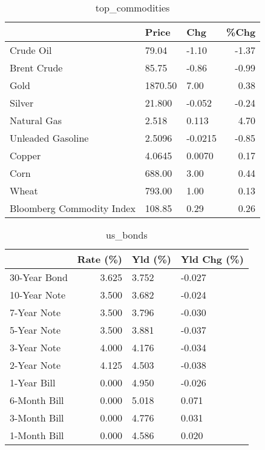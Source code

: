 \documentclass{article}%
\begin{document}
\begin{table}[htbp]%
\caption{top\_commodities}%
\centering%
\begin{adjustbox}{width=1\textwidth}%
\begin{tabular}{lllr}
\toprule
                          &   Price &     Chg &  \%Chg \\
\midrule
               Crude Oil  &   79.04 &   -1.10 & -1.37 \\
             Brent Crude  &   85.75 &   -0.86 & -0.99 \\
                    Gold  & 1870.50 &    7.00 &  0.38 \\
                  Silver  &  21.800 &  -0.052 & -0.24 \\
             Natural Gas  &   2.518 &   0.113 &  4.70 \\
       Unleaded Gasoline  &  2.5096 & -0.0215 & -0.85 \\
                  Copper  &  4.0645 &  0.0070 &  0.17 \\
                    Corn  &  688.00 &    3.00 &  0.44 \\
                   Wheat  &  793.00 &    1.00 &  0.13 \\
Bloomberg Commodity Index &  108.85 &    0.29 &  0.26 \\
\bottomrule
\end{tabular}
%
\end{adjustbox}%
\end{table}

%


\begin{table}[htbp]%
\caption{us\_bonds}%
\centering%
\begin{adjustbox}{width=1\textwidth}%
\begin{tabular}{lrll}
\toprule
             &  Rate (\%) & Yld (\%) & Yld Chg (\%) \\
\midrule
30-Year Bond &     3.625 &   3.752 &      -0.027 \\
10-Year Note &     3.500 &   3.682 &      -0.024 \\
 7-Year Note &     3.500 &   3.796 &      -0.030 \\
 5-Year Note &     3.500 &   3.881 &      -0.037 \\
 3-Year Note &     4.000 &   4.176 &      -0.034 \\
 2-Year Note &     4.125 &   4.503 &      -0.038 \\
 1-Year Bill &     0.000 &   4.950 &      -0.026 \\
6-Month Bill &     0.000 &   5.018 &       0.071 \\
3-Month Bill &     0.000 &   4.776 &       0.031 \\
1-Month Bill &     0.000 &   4.586 &       0.020 \\
\bottomrule
\end{tabular}
%
\end{adjustbox}%
\end{table}
\end{document}
